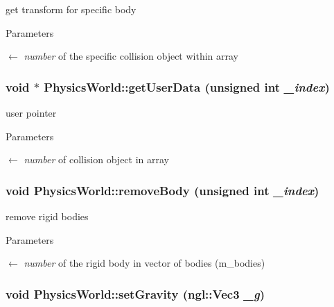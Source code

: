 get transform for specific body 
\begin{DoxyParams}{Parameters}
\item[\mbox{$\leftarrow$} {\em number}]of the specific collision object within array \end{DoxyParams}
\hypertarget{classPhysicsWorld_aa70cfe601f4ee449c385027899e37b74}{
\subsubsection[{getUserData}]{\setlength{\rightskip}{0pt plus 5cm}void $\ast$ PhysicsWorld::getUserData (unsigned int {\em \_\-index})}}
\label{classPhysicsWorld_aa70cfe601f4ee449c385027899e37b74}


user pointer 
\begin{DoxyParams}{Parameters}
\item[\mbox{$\leftarrow$} {\em number}]of collision object in array \end{DoxyParams}
\hypertarget{classPhysicsWorld_af4360b1fd73bccb9daad2f0e2e010324}{
\subsubsection[{removeBody}]{\setlength{\rightskip}{0pt plus 5cm}void PhysicsWorld::removeBody (unsigned int {\em \_\-index})}}
\label{classPhysicsWorld_af4360b1fd73bccb9daad2f0e2e010324}


remove rigid bodies 
\begin{DoxyParams}{Parameters}
\item[\mbox{$\leftarrow$} {\em number}]of the rigid body in vector of bodies (m\_\-bodies) \end{DoxyParams}
\hypertarget{classPhysicsWorld_a2cdbd862a8cd35eed77772fa870a3d83}{
\subsubsection[{setGravity}]{\setlength{\rightskip}{0pt plus 5cm}void PhysicsWorld::setGravity (ngl::Vec3 {\em \_\-g})}}
\label{classPhysicsWorld_a2cdbd862a8cd35eed77772fa870a3d83}


